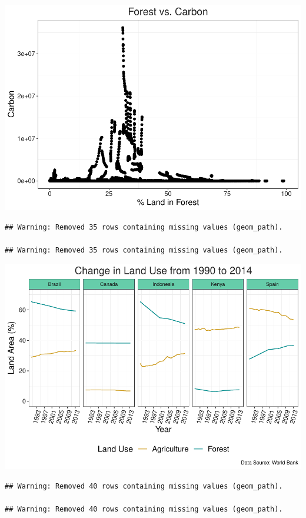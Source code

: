 \documentclass[12pt,]{article}
\begin{document}
\includegraphics{Marx_ENV872_Project_files/figure-latex/unnamed-chunk-5-4.pdf}

\begin{verbatim}
## Warning: Removed 35 rows containing missing values (geom_path).

## Warning: Removed 35 rows containing missing values (geom_path).
\end{verbatim}

\includegraphics{Marx_ENV872_Project_files/figure-latex/unnamed-chunk-6-1.pdf}

\begin{verbatim}
## Warning: Removed 40 rows containing missing values (geom_path).

## Warning: Removed 40 rows containing missing values (geom_path).
\end{verbatim}
\end{document}
